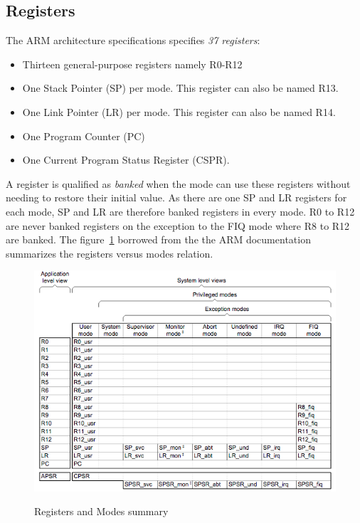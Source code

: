 \subsection{Registers}
The ARM architecture specifications specifies \textit{37 registers}:
\begin{itemize}
\item Thirteen general-purpose registers namely R0-R12
\item One Stack Pointer (SP) per mode. This register can also be named R13.
\item One Link Pointer (LR) per mode. This register can also be named R14.
\item One Program Counter (PC)
\item One Current Program Status Register (CSPR).
\end{itemize}

A register is qualified as \textit{banked} when the mode can use these registers without needing to restore their initial value. As there are one SP and LR registers for each mode, SP and LR are therefore banked registers in every mode. R0 to R12 are never banked registers on the exception to the FIQ mode where R8 to R12 are banked.
The figure~\ref{fig:chapter2_registers_vs_modes} borrowed from the the ARM documentation summarizes the registers versus modes relation.

\begin{figure}[H]
\begin{center}
\includegraphics[width=1\textwidth]{includes/figures/chapter2_registers_vs_modes.png}  \\[0.5 cm]
\end{center}
\caption{Registers and Modes summary}
\label{fig:chapter2_registers_vs_modes}
\end{figure}


